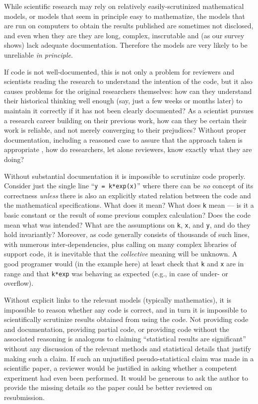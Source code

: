 \documentclass{comjnl}
\begin{document}
While scientific research may rely on relatively easily-scrutinized mathematical models, or models that seem in principle easy to mathematize, the models that are run on computers to obtain the results published are sometimes not disclosed, and even when they are they are long, complex, inscrutable and (as our survey shows) lack adequate documentation. Therefore the models are very likely to be unreliable \emph{in principle}. 

If code is not well-documented, this is not only a problem for reviewers and scientists reading the research to understand the intention of the code, but it also causes problems for the original researchers themselves: how can they understand their historical thinking well enough (say, just a few weeks or months later) to maintain it correctly if it has not been clearly documented? As a scientist pursues a research career building on their previous work, how can they be certain their work is reliable, and not merely converging to their  prejudices? Without proper documentation, including a reasoned case to assure that the approach taken is appropriate \cite{assurance-case}, how do researchers, let alone reviewers, know exactly what they are doing?

Without substantial documentation it is impossible to scrutinize code properly. Consider just the single line ``\texttt{y = k*exp(x)}'' where there can be \emph{no\/} concept of its correctness \emph{unless\/} there is also an explicitly stated relation between the code and the mathematical specifications. What does it mean? What does \texttt{k} mean --- is it a basic constant or the result of some previous complex calculation? Does the code mean what was intended? What are the assumptions on \texttt{k}, \texttt{x}, and \texttt{y}, and do they hold invariantly? Moreover, as code generally consists of thousands of such lines, with numerous inter-dependencies, plus calling on many complex libraries of support code, it is inevitable that the \emph{collective\/} meaning will be unknown. A good programer would (in the example here) at least check that \texttt{k} and \texttt{x} are in range and that \texttt{k*exp} was behaving as expected (e.g., in case of under- or overflow).

Without explicit links to the relevant models (typically mathematics), it is impossible to reason whether any code is correct, and in turn it is impossible to scientifically scrutinize results obtained from using the code. Not providing code and documentation, providing partial code, or providing code without the associated reasoning is analogous to claiming ``statistical results are significant'' without any discussion of the relevant methods and statistical details that justify making such a claim. If such an unjustified pseudo-statistical claim was made in a scientific paper, a reviewer would be justified in asking whether a competent experiment had even been performed. It would be generous to ask the author to provide the missing details so the paper could be better reviewed on resubmission. 
\end{document}
